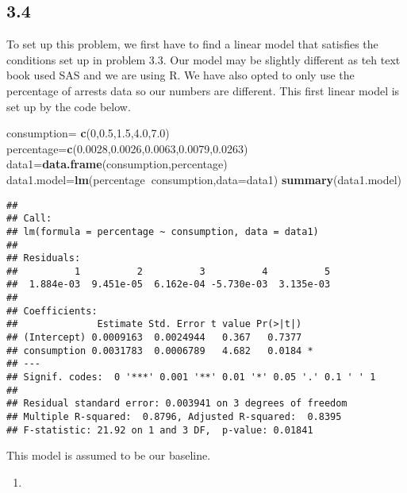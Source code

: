 \documentclass[
]{article}
\newenvironment{Shaded}{\begin{snugshade}}{\end{snugshade}}
\newcommand{\DataTypeTok}[1]{\textcolor[rgb]{0.13,0.29,0.53}{#1}}
\newcommand{\DecValTok}[1]{\textcolor[rgb]{0.00,0.00,0.81}{#1}}
\newcommand{\FloatTok}[1]{\textcolor[rgb]{0.00,0.00,0.81}{#1}}
\newcommand{\KeywordTok}[1]{\textcolor[rgb]{0.13,0.29,0.53}{\textbf{#1}}}
\newcommand{\NormalTok}[1]{#1}
\newcommand{\OperatorTok}[1]{\textcolor[rgb]{0.81,0.36,0.00}{\textbf{#1}}}
\newcommand{\StringTok}[1]{\textcolor[rgb]{0.31,0.60,0.02}{#1}}
\begin{document}
\hypertarget{section-2}{%
\subsection{3.4}\label{section-2}}

To set up this problem, we first have to find a linear model that
satisfies the conditions set up in problem 3.3. Our model may be
slightly different as teh text book used SAS and we are using R. We have
also opted to only use the percentage of arrests data so our numbers are
different. This first linear model is set up by the code below.

\begin{Shaded}
\begin{Highlighting}[]
\NormalTok{consumption=}\StringTok{ }\KeywordTok{c}\NormalTok{(}\DecValTok{0}\NormalTok{,}\FloatTok{0.5}\NormalTok{,}\FloatTok{1.5}\NormalTok{,}\FloatTok{4.0}\NormalTok{,}\FloatTok{7.0}\NormalTok{)}
\NormalTok{percentage=}\KeywordTok{c}\NormalTok{(}\FloatTok{0.0028}\NormalTok{,}\FloatTok{0.0026}\NormalTok{,}\FloatTok{0.0063}\NormalTok{,}\FloatTok{0.0079}\NormalTok{,}\FloatTok{0.0263}\NormalTok{)}
\NormalTok{data1=}\KeywordTok{data.frame}\NormalTok{(consumption,percentage)}
\NormalTok{data1.model=}\KeywordTok{lm}\NormalTok{(percentage}\OperatorTok{~}\NormalTok{consumption,}\DataTypeTok{data=}\NormalTok{data1)}
\KeywordTok{summary}\NormalTok{(data1.model)}
\end{Highlighting}
\end{Shaded}

\begin{verbatim}
## 
## Call:
## lm(formula = percentage ~ consumption, data = data1)
## 
## Residuals:
##          1          2          3          4          5 
##  1.884e-03  9.451e-05  6.162e-04 -5.730e-03  3.135e-03 
## 
## Coefficients:
##              Estimate Std. Error t value Pr(>|t|)  
## (Intercept) 0.0009163  0.0024944   0.367   0.7377  
## consumption 0.0031783  0.0006789   4.682   0.0184 *
## ---
## Signif. codes:  0 '***' 0.001 '**' 0.01 '*' 0.05 '.' 0.1 ' ' 1
## 
## Residual standard error: 0.003941 on 3 degrees of freedom
## Multiple R-squared:  0.8796, Adjusted R-squared:  0.8395 
## F-statistic: 21.92 on 1 and 3 DF,  p-value: 0.01841
\end{verbatim}

This model is assumed to be our baseline.

\begin{enumerate}
\def\labelenumi{\alph{enumi})}
\item
\end{enumerate}
\end{document}
